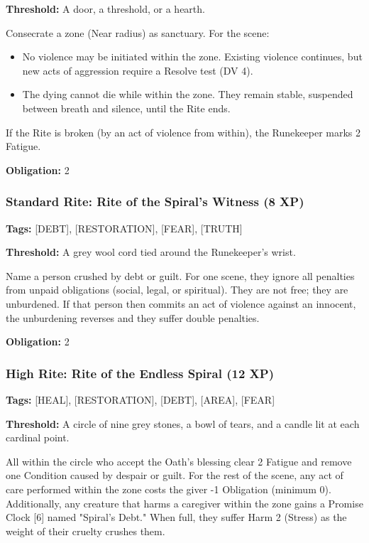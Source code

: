 \textbf{Threshold:} A door, a threshold, or a hearth.

Consecrate a zone (Near radius) as sanctuary. For the scene:
\begin{itemize}
\item No violence may be initiated within the zone. Existing violence continues, but new acts of aggression require a Resolve test (DV 4).
\item The dying cannot die while within the zone. They remain stable, suspended between breath and silence, until the Rite ends.
\end{itemize}

If the Rite is broken (by an act of violence from within), the Runekeeper marks 2 Fatigue.

\textbf{Obligation:} 2

\subsubsection{Standard Rite: Rite of the Spiral's Witness (8 XP)}

\textbf{Tags:} [DEBT], [RESTORATION], [FEAR], [TRUTH]

\textbf{Threshold:} A grey wool cord tied around the Runekeeper's wrist.

Name a person crushed by debt or guilt. For one scene, they ignore all penalties from unpaid obligations (social, legal, or spiritual). They are not free; they are unburdened. If that person then commits an act of violence against an innocent, the unburdening reverses and they suffer double penalties.

\textbf{Obligation:} 2

\subsubsection{High Rite: Rite of the Endless Spiral (12 XP)}

\textbf{Tags:} [HEAL], [RESTORATION], [DEBT], [AREA], [FEAR]

\textbf{Threshold:} A circle of nine grey stones, a bowl of tears, and a candle lit at each cardinal point.

All within the circle who accept the Oath's blessing clear 2 Fatigue and remove one Condition caused by despair or guilt. For the rest of the scene, any act of care performed within the zone costs the giver -1 Obligation (minimum 0). Additionally, any creature that harms a caregiver within the zone gains a Promise Clock [6] named "Spiral's Debt." When full, they suffer Harm 2 (Stress) as the weight of their cruelty crushes them.

